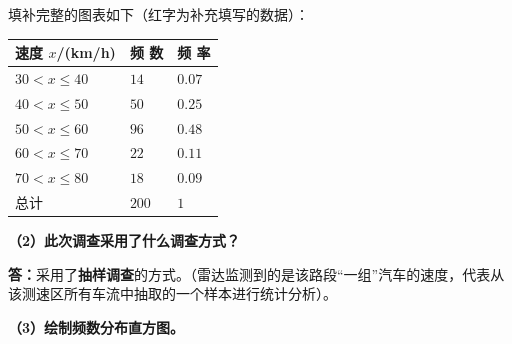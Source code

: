 填补完整的图表如下（红字为补充填写的数据）：

\vspace{0.4cm}
\begin{center}
\renewcommand{\arraystretch}{1.6}
\begin{tabular}{|>{\centering\arraybackslash}p{4.5cm}|>{\centering\arraybackslash}p{3cm}|>{\centering\arraybackslash}p{3cm}|}
\hline
\cellcolor{gray!15} 速度 $x$/(km/h) & \cellcolor{gray!15} 频 \quad 数 & \cellcolor{gray!15} 频 \quad 率 \\
\hline
$30 < x \leqslant 40$ & $14$ & $0.07$ \\
\hline
$40 < x \leqslant 50$ & $50$ & \textbf{\textcolor{red!70!black}{$0.25$}} \\
\hline
$50 < x \leqslant 60$ & \textbf{\textcolor{red!70!black}{$96$}} & $0.48$ \\
\hline
$60 < x \leqslant 70$ & \textbf{\textcolor{red!70!black}{$22$}} & \textbf{\textcolor{red!70!black}{$0.11$}} \\
\hline
$70 < x \leqslant 80$ & $18$ & $0.09$ \\
\hline
总计 & \textbf{\textcolor{red!70!black}{$200$}} & $1$ \\
\hline
\end{tabular}
\end{center}

\vspace{0.6cm}

\textbf{（2）此次调查采用了什么调查方式？}

\vspace{0.2cm}
\textbf{答：}采用了\textbf{抽样调查}的方式。（雷达监测到的是该路段“一组”汽车的速度，代表从该测速区所有车流中抽取的一个样本进行统计分析）。

\vspace{0.6cm}

\textbf{（3）绘制频数分布直方图。}

